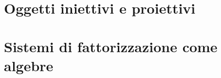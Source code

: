 \section[Iniettivi e proiettivi]{Oggetti iniettivi e proiettivi}
\begin{esercizi}
 \item
 \item
 \item
 \item
 \item
\end{esercizi}
\section[Fattorizzazione e algebre]{Sistemi di fattorizzazione come algebre}
\begin{esercizi}
 \item
 \item
 \item
 \item
 \item
\end{esercizi}

